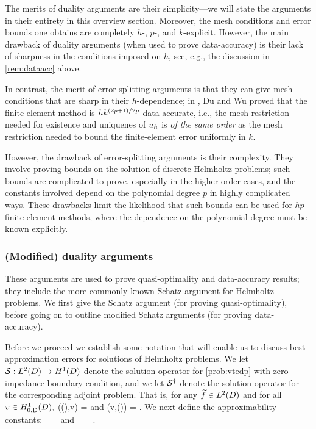 The merits of duality arguments are their simplicity---we will state the arguments in their entirety in this overview section. Moreover, the mesh conditions and error bounds one obtains are completely $h$-, $p$-, and $k$-explicit. However, the main drawback of duality arguments (when used to prove data-accuracy) is their lack of sharpness in the conditions imposed on $h$, see, e.g., the discussion in \cref{rem:dataacc} above.

In contrast, the merit of error-splitting arguments is that they can give mesh conditions that are sharp in their $h$-dependence; in \cite{DuWu:15}, Du and Wu proved that the finite-element method is $hk^{(2p+1)/2p}$-data-accurate, i.e., the mesh restriction needed for existence and uniquenes of $u_{h}$ is \emph{of the same order} as the mesh restriction needed to bound the finite-element error uniformly in $k.$

However, the drawback of error-splitting arguments is their complexity. They involve proving bounds on the solution of discrete Helmholtz problems; such bounds are complicated to prove, especially in the higher-order cases, and the constants involved depend on the polynomial degree $p$ in highly complicated ways. These drawbacks limit the likelihood that such bounds can be used for $hp$-finite-element methods, where the dependence on the polynomial degree must be known explicitly.


\subsubsection{(Modified) duality arguments}
These arguments are used to prove quasi-optimality and data-accuracy results; they include the more commonly known Schatz argument for Helmholtz problems. We first give the Schatz argument (for proving quasi-optimality), before going on to outline modified Schatz arguments (for proving data-accuracy).

Before we proceed we establish some notation that will enable us to discuss best approximation errors for solutions of Helmholtz problems. We let $\solfem:\LtD\rightarrow \HoD$ denote the solution operator for \cref{prob:vtedp} with zero impedance boundary condition, and we let $\mathcal S^{\dagger}$ denote the solution operator for the corresponding adjoint problem. That is, for any $\ftilde \in \LtD$ and for all $v \in \HozDD,$
\beqs
\aT(\solfem(\ftilde),v) = 
\eeqs
and
\beqs
\aT(v,\solfems(\ftilde)) = .
\eeqs
We next define the approximability constants:
\beq\label{eq:wbadef}
\wba \de \sup_{\ftilde \in \LtD}\inf_{\vh \in \Vhp} \frac{\NHokD{\solfem(\ftilde) - \vh}}{\NLtD{\ftilde}}
\eeq
and
\beqs
\wbaadj \de \sup_{\ftilde \in \LtD}\inf_{\vh \in \Vhp} \frac{\NHokD{\solfems(\ftilde) - \vh}}{\NLtD{\ftilde}}.
\eeqs

